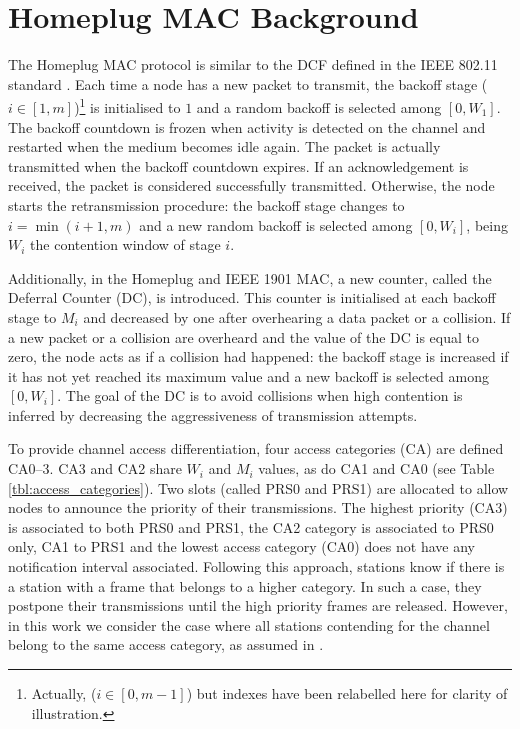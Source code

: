 \documentclass[preprint,12pt]{elsarticle}
\begin{document}
\section{Homeplug MAC Background}\label{sec:background}



The Homeplug MAC protocol is similar to the DCF defined in the IEEE 802.11 standard \cite{IEEE80211-IEEESTD1999}. Each time a node has a new packet to transmit, the backoff stage ($i \in [1,m]$)\footnote{Actually, ($i \in [0,m-1]$) but indexes have been relabelled here for clarity of illustration.} is initialised to $1$ and a random backoff is selected among $[0,W_{1}]$. The backoff countdown is frozen when activity is detected on the channel and restarted when the medium becomes idle again. The packet is actually transmitted when the backoff countdown expires. If an acknowledgement is received, the packet is considered successfully transmitted. Otherwise, the node starts the retransmission procedure: the backoff stage changes to $i=\min(i+1,m)$ and a new random backoff is selected among $[0,W_{i}]$, being $W_{i}$ the contention window of stage $i$. 

Additionally, in the Homeplug and IEEE 1901 MAC, a new counter, called the Deferral Counter (DC), is introduced. This counter is initialised at each backoff stage to $M_i$ and decreased by one after overhearing a data packet or a collision. If a new packet or a collision are overheard and the value of the DC is equal to zero, the node acts as if a collision had happened: the backoff stage is increased if it has not yet reached its maximum value and a new backoff is selected among $[0,W_{i}]$. The goal of the DC is to avoid collisions when high contention is inferred by decreasing the aggressiveness of transmission attempts.

To provide channel access differentiation, four access categories (CA) are defined CA0--3. CA3 and CA2 share $W_i$ and $M_i$ values, as do CA1 and CA0 (see Table \ref{tbl:access_categories}). Two slots (called PRS0 and PRS1) are allocated to allow nodes to announce the priority of their transmissions. The highest priority (CA3) is associated to both PRS0 and PRS1, the CA2 category is associated to PRS0 only, CA1 to PRS1 and the lowest access category (CA0) does not have any notification interval associated. Following this approach, stations know if there is a station with a frame that belongs to a higher category. In such a case, they postpone their transmissions until the high priority frames are released. However, in this work we consider the case where all stations contending for the channel belong to the same access category, as assumed in \cite{chung2006performance}.
\end{document}

